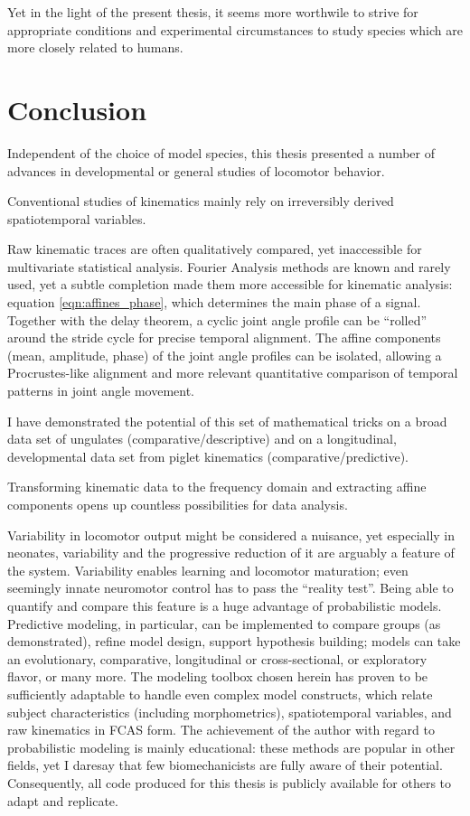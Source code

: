 Yet in the light of the present thesis, it seems more worthwile to strive for appropriate conditions and experimental circumstances to study species which are more closely related to humans.


\section{Conclusion}
\label{sec:orgf0a6da4}
Independent of the choice of model species, this thesis presented a number of advances in developmental or general studies of locomotor behavior.

\bigskip
Conventional studies of kinematics mainly rely on irreversibly derived spatiotemporal variables.

Raw kinematic traces are often qualitatively compared, yet inaccessible for multivariate statistical analysis.
Fourier Analysis methods are known and rarely used, yet a subtle completion made them more accessible for kinematic analysis: equation \eqref{eqn:affines_phase}, which determines the main phase of a signal.
Together with the delay theorem, a cyclic joint angle profile can be ``rolled'' around the stride cycle for precise temporal alignment.
The affine components (mean, amplitude, phase) of the joint angle profiles can be isolated, allowing a Procrustes-like alignment and more relevant quantitative comparison of temporal patterns in joint angle movement.

I have demonstrated the potential of this set of mathematical tricks on a broad data set of ungulates (comparative/descriptive) and on a longitudinal, developmental data set from piglet kinematics (comparative/predictive).


\bigskip
Transforming kinematic data to the frequency domain and extracting affine components opens up countless possibilities for data analysis.

Variability in locomotor output might be considered a nuisance, yet especially in neonates, variability and the progressive reduction of it are arguably a feature of the system.
Variability enables learning and locomotor maturation; even seemingly innate neuromotor control has to pass the ``reality test''.
Being able to quantify and compare this feature is a huge advantage of probabilistic models.
Predictive modeling, in particular, can be implemented to compare groups (as demonstrated), refine model design, support hypothesis building; models can take an evolutionary, comparative, longitudinal or cross-sectional, or exploratory flavor, or many more.
The modeling toolbox chosen herein has proven to be sufficiently adaptable to handle even complex model constructs, which relate subject characteristics (including morphometrics), spatiotemporal variables, and raw kinematics in FCAS form.
The achievement of the author with regard to probabilistic modeling is mainly educational: these methods are popular in other fields, yet I daresay that few biomechanicists are fully aware of their potential.
Consequently, all code produced for this thesis is publicly available for others to adapt and replicate.

